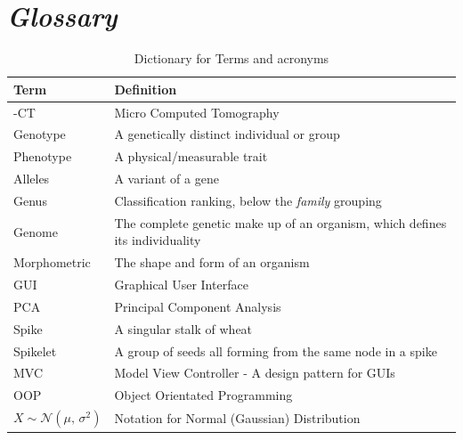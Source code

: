 \documentclass[11pt]{report}
\begin{document}
\chapter{\emph{Glossary}}
\label{sec:org2d38797}
\begin{table}[htbp]
\caption{\label{tab:org26d85fe}
Dictionary for Terms and acronyms}
\centering
\begin{tabularx}{\textwidth}{|l|X|}
\hline
\textbf{Term} & \textbf{Definition}\\
\hline
\textmu{}-CT & Micro Computed Tomography\\
\hline
Genotype & A genetically distinct individual or group\\
\hline
Phenotype & A physical/measurable trait\\
\hline
Alleles & A variant of a gene\\
\hline
Genus & Classification ranking, below the \emph{family} grouping\\
\hline
Genome & The complete genetic make up of an organism, which defines its individuality\\
\hline
Morphometric & The shape and form of an organism\\
\hline
GUI & Graphical User Interface\\
\hline
PCA & Principal Component Analysis\\
\hline
Spike & A singular stalk of wheat\\
\hline
Spikelet & A group of seeds all forming from the same node in a spike\\
\hline
MVC & Model View Controller - A design pattern for GUIs\\
\hline
OOP & Object Orientated Programming\\
\hline
\(X \sim \mathcal{N}(\mu,\,\sigma^{2})\) & Notation for Normal (Gaussian) Distribution\\
\hline
\end{tabularx}
\end{table}

\clearpage
\end{document}

